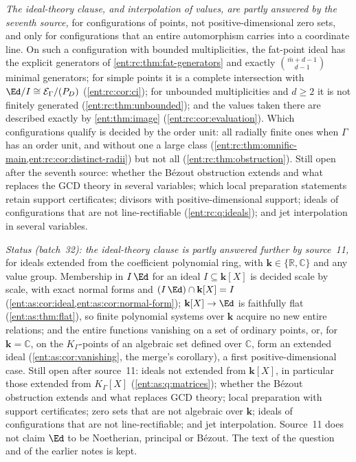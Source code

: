 \documentclass[11pt]{article}
\theoremstyle{plain}
\theoremstyle{plain}
\theoremstyle{plain}
\theoremstyle{definition}
\theoremstyle{definition}
\theoremstyle{definition}
\theoremstyle{definition}
\theoremstyle{remark}
\newcommand{\C}{\mathbb C}\newcommand{\R}{\mathbb R}
\newcommand{\K}{K_\Gamma}\newcommand{\KD}{K_\Delta}
\newcommand{\E}{\mathcal E_\Gamma}
\newcommand{\kk}{\mathbf k}\newcommand{\PP}{\mathbb P}
\begin{document}
\emph{The ideal-theory clause, and interpolation of values, are partly
answered by the seventh source,} for configurations of points, not
positive-dimensional zero sets, and only for configurations that an entire
automorphism carries into a coordinate line. On such a configuration with
bounded multiplicities, the fat-point ideal has the explicit generators of
\cref{ent:rc:thm:fat-generators} and exactly $\binom{\bar m+d-1}{d-1}$ minimal
generators; for simple points it is a complete intersection with
$\Ed/I\cong\E/(P_D)$ (\cref{ent:rc:cor:ci}); for unbounded multiplicities and
$d\ge2$ it is not finitely generated (\cref{ent:rc:thm:unbounded}); and the
values taken there are described exactly by \cref{ent:thm:image}
(\cref{ent:rc:cor:evaluation}). Which configurations qualify is decided by the
order unit: all radially finite ones when $\Gamma$ has an order unit, and
without one a large class (\cref{ent:rc:thm:omnific-main,ent:rc:cor:distinct-radii})
but not all (\cref{ent:rc:thm:obstruction}). Still open after the seventh
source: whether the B\'ezout obstruction extends and what replaces the GCD
theory in several variables; which local preparation statements retain
support certificates; divisors with positive-dimensional support; ideals of
configurations that are not line-rectifiable (\cref{ent:rc:q:ideals}); and
jet interpolation in several variables.

\emph{Status (batch~32): the ideal-theory clause is partly answered further by
source~11,} for ideals extended from the coefficient polynomial ring, with
$\kk\in\{\R,\C\}$ and any value group. Membership in $I\,\Ed$ for an ideal
$I\subseteq\kk[X]$ is decided scale by scale, with exact normal forms and
$(I\,\Ed)\cap\kk[X]=I$
(\cref{ent:as:cor:ideal,ent:as:cor:normal-form}); $\kk[X]\to\Ed$ is faithfully
flat (\cref{ent:as:thm:flat}), so finite polynomial systems over $\kk$ acquire
no new entire relations; and the entire functions vanishing on a set of
ordinary points, or, for $\kk=\C$, on the $\K$-points of an algebraic set
defined over $\C$, form an extended ideal (\cref{ent:as:cor:vanishing}, the
merge's corollary), a first positive-dimensional case.
Still open after source~11: ideals not extended from $\kk[X]$, in particular
those extended from $\K[X]$ (\cref{ent:as:q:matrices}); whether the B\'ezout
obstruction extends and what replaces GCD theory; local preparation with
support certificates; zero sets that are not algebraic over $\kk$; ideals of
configurations that are not line-rectifiable; and jet interpolation. Source~11
does not claim $\Ed$ to be Noetherian, principal or B\'ezout. The text of the
question and of the earlier notes is kept.
\end{document}
